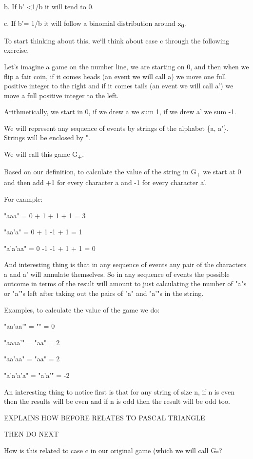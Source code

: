 \documentclass[12pt,reqno]{amsart}
\begin{document}
b. If b' \textless 1/b it will tend to 0.

c. If b'= 1/b it will follow a binomial distribution around x\textsubscript{0}.

To start thinking about this, we`ll think about case c through the following exercise. 

Let's imagine a game on the number line, we are starting on 0, and then when we flip a fair coin, if it comes heads (an event we will call a) we move one full positive integer to the right and if it comes tails (an event we will call a') we move a full positive integer to the left.

Arithmetically, we start in 0, if we drew a we sum 1, if we drew a' we sum -1.

We will represent any sequence of events by strings of the alphabet \{a, a'\}. Strings will be enclosed by ".

We will call this game G\textsubscript{+}.

Based on our definition, to calculate the value of the string in G\textsubscript{+} we start at 0 and then add +1 for every character a and -1 for every character a'.

For example:

"aaa" = 0 + 1 + 1 + 1 = 3

"aa'a" = 0 + 1 -1 + 1 = 1

"a'a'aa" = 0 -1 -1 + 1 + 1 = 0


And interesting thing is that in any sequence of events any pair of the characters a and a' will annulate themselves. So in any sequence of events the possible outcome in terms of the result will amount to just calculating the number of "a"s or "a'"s left after taking out the pairs of "a" and "a'"s in the string.

Examples, to calculate the value of the game we do: 

"aa'aa'" = "" = 0

"aaaa'" = "aa" =  2

"aa'aa" = "aa" = 2

"a'a'a'a" = "a'a'" = -2

An interesting thing to notice first is that for any string of size n, if n is even then the results will be even and if n is odd then the result will be odd too.

EXPLAINS HOW BEFORE RELATES TO PASCAL TRIANGLE

THEN DO NEXT


How is this related to case c in our original game (which we will call G\textsubscript{*}?
\end{document}
